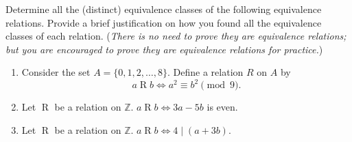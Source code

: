 \documentclass{article}
\theoremstyle{definition}
\begin{document}
\begin{question}{6}
    Determine all the (distinct) equivalence classes of the following equivalence relations. Provide a brief justification on how you found all the equivalence classes of each relation. (\textit{There is no need to prove they are equivalence relations; but you are encouraged to prove they are equivalence relations for practice.})
	\begin{enumerate}
	\item Consider the set $A = \{0, 1, 2, \dots, 8 \}$. Define a relation $R$ on $A$ by
	\[
	a\mathrel{R}b \iff a^2 \equiv b^2 \pmod{9}.
	\]
	\item Let $\mathrel{R}$ be a relation on $\mathbb{Z}$. $a\mathrel{R}b \iff 3a-5b$ is even.
	\item Let $\mathrel{R}$ be a relation on $\mathbb{Z}$. $a\mathrel{R}b \iff 4 \mid (a+3b)$.
	\end{enumerate}
\end{question}
\end{document}
